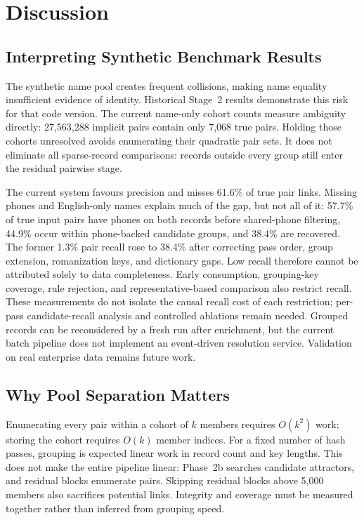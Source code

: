\documentclass{article}
\begin{document}
\section{Discussion}\label{sec:discussion}

\subsection{Interpreting Synthetic Benchmark Results}

The synthetic name pool creates frequent collisions, making name equality insufficient evidence of identity. Historical Stage~2 results demonstrate this risk for that code version. The current name-only cohort counts measure ambiguity directly: 27,563,288 implicit pairs contain only 7,068 true pairs. Holding those cohorts unresolved avoids enumerating their quadratic pair sets. It does not eliminate all sparse-record comparisons: records outside every group still enter the residual pairwise stage.

The current system favours precision and misses 61.6\% of true pair links. Missing phones and English-only names explain much of the gap, but not all of it: 57.7\% of true input pairs have phones on both records before shared-phone filtering, 44.9\% occur within phone-backed candidate groups, and 38.4\% are recovered. The former 1.3\% pair recall rose to 38.4\% after correcting pass order, group extension, romanization keys, and dictionary gaps. Low recall therefore cannot be attributed solely to data completeness. Early consumption, grouping-key coverage, rule rejection, and representative-based comparison also restrict recall. These measurements do not isolate the causal recall cost of each restriction; per-pass candidate-recall analysis and controlled ablations remain needed. Grouped records can be reconsidered by a fresh run after enrichment, but the current batch pipeline does not implement an event-driven resolution service. Validation on real enterprise data remains future work.

\subsection{Why Pool Separation Matters}

Enumerating every pair within a cohort of $k$ members requires $O(k^2)$ work; storing the cohort requires $O(k)$ member indices. For a fixed number of hash passes, grouping is expected linear work in record count and key lengths. This does not make the entire pipeline linear: Phase~2b searches candidate attractors, and residual blocks enumerate pairs. Skipping residual blocks above 5,000 members also sacrifices potential links. Integrity and coverage must be measured together rather than inferred from grouping speed.
\end{document}
